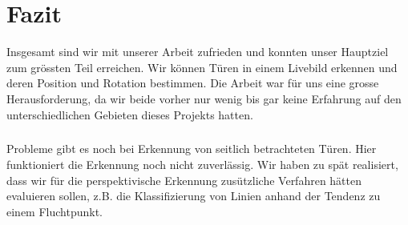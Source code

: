 \chapter{Fazit}

Insgesamt sind wir mit unserer Arbeit zufrieden und konnten unser Hauptziel zum grössten Teil erreichen. Wir können Türen in einem Livebild erkennen und deren Position und Rotation bestimmen. Die Arbeit war für uns eine grosse Herausforderung, da wir beide vorher nur wenig bis gar keine Erfahrung auf den unterschiedlichen Gebieten dieses Projekts hatten.
\noindent\paragraph{}
Probleme gibt es noch bei Erkennung von seitlich betrachteten Türen. Hier funktioniert die Erkennung noch nicht zuverlässig. Wir haben zu spät realisiert, dass wir für die perspektivische Erkennung zusützliche Verfahren hätten evaluieren sollen, z.B. die Klassifizierung von Linien anhand der Tendenz zu einem Fluchtpunkt.


